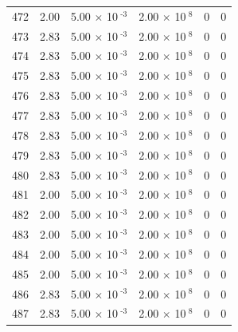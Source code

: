 \documentclass[a4paper,11pt]{article}
\begin{document}
\begin{center}
\begin{longtable}{|R{1.5cm}|R{2.4cm}|R{2.4cm}|R{2.4cm}|R{2.4cm}|R{2.4cm}|}
  472 &   2.00  &         5.00 $\times$ 10$^{\text{          -3}}$  &         2.00 $\times$ 10$^{\text{           8}}$  & 0  & 0 \\
  473 &   2.83  &         5.00 $\times$ 10$^{\text{          -3}}$  &         2.00 $\times$ 10$^{\text{           8}}$  & 0  & 0 \\
  474 &   2.83  &         5.00 $\times$ 10$^{\text{          -3}}$  &         2.00 $\times$ 10$^{\text{           8}}$  & 0  & 0 \\
  475 &   2.83  &         5.00 $\times$ 10$^{\text{          -3}}$  &         2.00 $\times$ 10$^{\text{           8}}$  & 0  & 0 \\
  476 &   2.83  &         5.00 $\times$ 10$^{\text{          -3}}$  &         2.00 $\times$ 10$^{\text{           8}}$  & 0  & 0 \\
  477 &   2.83  &         5.00 $\times$ 10$^{\text{          -3}}$  &         2.00 $\times$ 10$^{\text{           8}}$  & 0  & 0 \\
  478 &   2.83  &         5.00 $\times$ 10$^{\text{          -3}}$  &         2.00 $\times$ 10$^{\text{           8}}$  & 0  & 0 \\
  479 &   2.83  &         5.00 $\times$ 10$^{\text{          -3}}$  &         2.00 $\times$ 10$^{\text{           8}}$  & 0  & 0 \\
  480 &   2.83  &         5.00 $\times$ 10$^{\text{          -3}}$  &         2.00 $\times$ 10$^{\text{           8}}$  & 0  & 0 \\
  481 &   2.00  &         5.00 $\times$ 10$^{\text{          -3}}$  &         2.00 $\times$ 10$^{\text{           8}}$  & 0  & 0 \\
  482 &   2.00  &         5.00 $\times$ 10$^{\text{          -3}}$  &         2.00 $\times$ 10$^{\text{           8}}$  & 0  & 0 \\
  483 &   2.00  &         5.00 $\times$ 10$^{\text{          -3}}$  &         2.00 $\times$ 10$^{\text{           8}}$  & 0  & 0 \\
  484 &   2.00  &         5.00 $\times$ 10$^{\text{          -3}}$  &         2.00 $\times$ 10$^{\text{           8}}$  & 0  & 0 \\
  485 &   2.00  &         5.00 $\times$ 10$^{\text{          -3}}$  &         2.00 $\times$ 10$^{\text{           8}}$  & 0  & 0 \\
  486 &   2.83  &         5.00 $\times$ 10$^{\text{          -3}}$  &         2.00 $\times$ 10$^{\text{           8}}$  & 0  & 0 \\
  487 &   2.83  &         5.00 $\times$ 10$^{\text{          -3}}$  &         2.00 $\times$ 10$^{\text{           8}}$  & 0  & 0 \\

\end{longtable}
\end{center}
\end{document}
